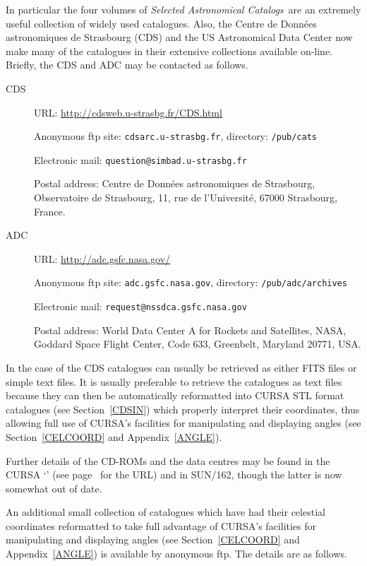 \documentclass[twoside,11pt]{starlink}
\begin{document}
In particular the four volumes of \textit{Selected Astronomical Catalogs}\,
are an extremely useful collection of widely used catalogues.  Also, the
Centre de Donn\'{e}es astronomiques de Strasbourg (CDS) and the US
Astronomical Data Center now make many of the catalogues  in their
extensive collections available on-line.  Briefly, the CDS and ADC may be
contacted as follows.

\begin{description}

  \item[CDS] URL:
   \url{http://cdsweb.u-strasbg.fr/CDS.html}

   Anonymous ftp site: \texttt{cdsarc.u-strasbg.fr}, directory: \texttt{/pub/cats}

   Electronic mail: \texttt{question@simbad.u-strasbg.fr}

   Postal address: Centre de Donn\'{e}es astronomiques de
   Strasbourg, Observatoire de Strasbourg, 11, rue de l'Universit\'{e},
   67000 Strasbourg, France.

  \item[ADC]  URL: \url{http://adc.gsfc.nasa.gov/}

   Anonymous ftp site: \texttt{adc.gsfc.nasa.gov}, directory: \texttt{/pub/adc/archives}

   Electronic mail: \texttt{request@nssdca.gsfc.nasa.gov}

   Postal address: World Data Center A for Rockets and
   Satellites, NASA, Goddard Space Flight Center, Code 633,
   Greenbelt, Maryland 20771, USA.

\end{description}

In the case of the CDS catalogues can usually be retrieved as either
FITS files or simple text files.  It is usually preferable to retrieve
the catalogues as text files because they can then be automatically
reformatted into CURSA STL format catalogues (see Section~\ref{CDSIN})
which properly interpret their coordinates, thus allowing full use of
CURSA's facilities for manipulating and displaying angles (see
Section~\ref{CELCOORD} and Appendix~\ref{ANGLE}).

Further details of the CD-ROMs and the data centres may be found in the
CURSA
`'
(see page~\pageref{HOMEPAGE} for the URL) and in SUN/162\cite{SUN162},
though the latter is now somewhat out of date.

An additional small collection of catalogues which have had their celestial
coordinates reformatted to take full advantage of CURSA's facilities
for manipulating and displaying angles (see Section~\ref{CELCOORD} and
Appendix~\ref{ANGLE}) is available by anonymous ftp.  The details are
as follows.
\end{document}
